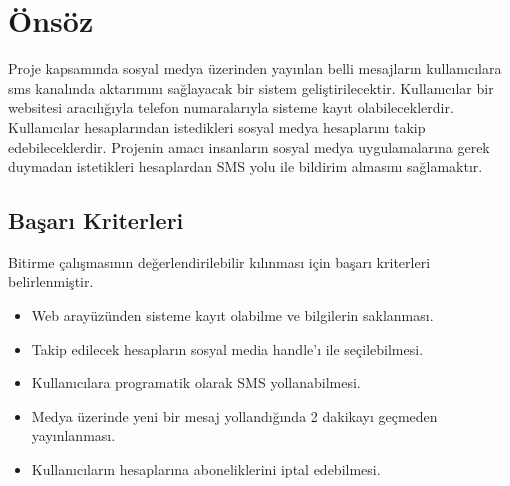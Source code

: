 \section{Önsöz}
Proje kapsamında sosyal medya üzerinden yayınlan belli mesajların kullanıcılara sms 
kanalında aktarımını sağlayacak bir sistem geliştirilecektir. Kullanıcılar bir 
websitesi aracılığıyla telefon numaralarıyla sisteme kayıt olabileceklerdir. 
Kullanıcılar hesaplarından istedikleri sosyal medya hesaplarını takip edebileceklerdir. 
Projenin amacı insanların sosyal medya uygulamalarına gerek duymadan istetikleri 
hesaplardan SMS yolu ile bildirim almasını sağlamaktır.


\subsection{Başarı Kriterleri}
Bitirme çalışmasının değerlendirilebilir kılınması için başarı kriterleri belirlenmiştir.
\begin{itemize}
  \item Web arayüzünden sisteme kayıt olabilme ve bilgilerin saklanması.
  \item Takip edilecek hesapların sosyal media handle’ı ile seçilebilmesi.
  \item Kullanıcılara programatik olarak SMS yollanabilmesi.
  \item Medya üzerinde yeni bir mesaj yollandığında 2 dakikayı geçmeden yayınlanması. 
  \item Kullanıcıların hesaplarına aboneliklerini iptal edebilmesi.
\end{itemize}



